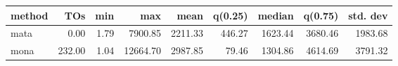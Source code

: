 \begin{tabular}{lrrrrrrrr}
\hline
 method   &    TOs &   min &      max &    mean &   q(0.25) &   median &   q(0.75) &   std. dev \\
\hline
 mata     &   0.00 &  1.79 &  7900.85 & 2211.33 &    446.27 &  1623.44 &   3680.46 &    1983.68 \\
 mona     & 232.00 &  1.04 & 12664.70 & 2987.85 &     79.46 &  1304.86 &   4614.69 &    3791.32 \\
\hline
\end{tabular}
